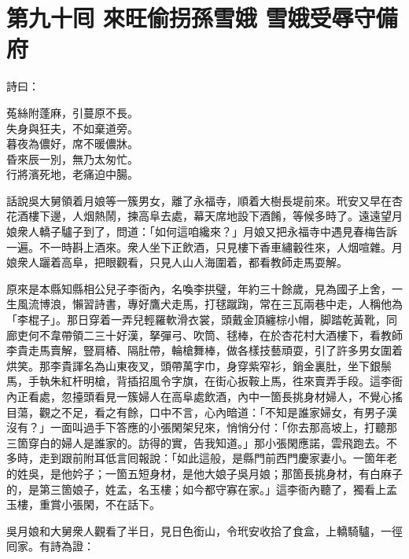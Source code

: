 
\chapter*{第九十囘 來旺偷拐孫雪娥 雪娥受辱守備府}


詩曰：

\begin{myquote}
菟絲附蓬麻，引蔓原不長。\\失身與狂夫，不如棄道旁。\\暮夜為儂好，席不暖儂牀。\\昏來辰一別，無乃太匆忙。\\行將濱死地，老痛迫中腸。
\end{myquote}

話說吳大舅領着月娘等一簇男女，離了永福寺，順着大樹長堤前來。玳安又早在杏花酒樓下邊，人烟熱鬧，揀高阜去處，幕天席地設下酒餚，等候多時了。遠遠望月娘衆人轎子驢子到了，問道：「如何這咱纔來？」月娘又把永福寺中遇見春梅告訴一遍。不一時斟上酒來。衆人坐下正飲酒，只見樓下香車繡轂徃來，人烟喧雜。月娘衆人躧着高阜，把眼觀看，只見人山人海圍着，都看教師走馬耍解。

原來是本縣知縣相公兒子李衙內，名喚李拱璧，年約三十餘歲，見為國子上舍，一生風流博浪，懶習詩書，專好鷹犬走馬，打毬蹴踘，常在三瓦兩巷中走，人稱他為「李棍子」。那日穿着一弄兒輕羅軟滑衣裳，頭戴金頂纏棕小帽，脚踏乾黃靴，同廊吏何不韋帶領二三十好漢，拏彈弓、吹筒、毬棒，在於杏花村大酒樓下，看教師李貴走馬賣解，豎肩樁、隔肚帶，輪槍舞棒，做各樣技藝頑耍，引了許多男女圍着烘笑。那李貴諢名為山東夜叉，頭帶萬字巾，身穿紫窄衫，銷金裏肚，坐下銀鬃馬，手執朱紅杆明槍，背插招風令字旗，在街心扳鞍上馬，徃來賣弄手段。這李衙內正看處，忽擡頭看見一簇婦人在高阜處飲酒，內中一箇長挑身材婦人，不覺心搖目蕩，觀之不足，看之有餘，口中不言，心內暗道：「不知是誰家婦女，有男子漢沒有？」{}一面叫過手下答應的小張閑架兒來，悄悄分付：「你去那高坡上，打聽那三箇穿白的婦人是誰家的。訪得的實，告我知道。」那小張閑應諾，雲飛跑去。不多時，走到跟前附耳低言囘報說：「如此這般，是縣門前西門慶家妻小。一箇年老的姓吳，是他妗子；一箇五短身材，是他大娘子吳月娘；那箇長挑身材，有白麻子的，是第三箇娘子，姓孟，名玉樓；如今都守寡在家。」這李衙內聽了，獨看上孟玉樓，重賞小張閑，不在話下。

吳月娘和大舅衆人觀看了半日，見日色銜山，令玳安收拾了食盒，上轎騎驢，一徑囘家。有詩為證：

